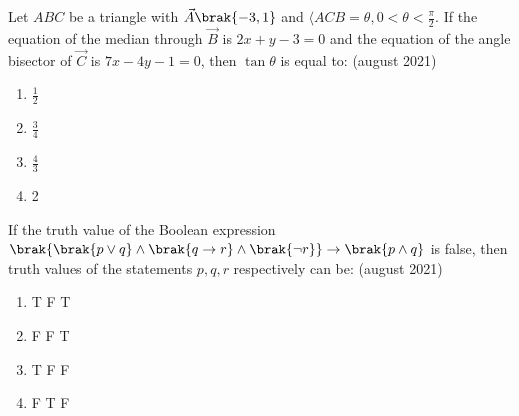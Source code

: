         \item Let $ABC$ be a triangle with $\vec{A}\brak{-3,1}$ and $\langle ACB=\theta,0<\theta<\frac{\pi}{2}$. If the equation of the median through $\vec{B}$ is $2x+y-3=0$ and the equation of the angle bisector of $\vec{C}$ is $7x-4y-1=0$, then $\tan \theta$ is equal to:
         \hfill{(august 2021)}  
		\begin{enumerate}
            \item $\frac{1}{2}$
            \item $\frac{3}{4}$
            \item $\frac{4}{3}$
            \item 2
        \end{enumerate}
        \item If the truth value of the Boolean expression $\brak{\brak{p \lor q} \land \brak{q\rightarrow r} \land \brak{\neg r}}\rightarrow \brak{p \land q}$ is false, then truth values of the statements $p,q,r$ respectively can be:
         \hfill{(august 2021)}  
	\begin{enumerate}
            \item T F T
            \item F F T
            \item T F F
            \item F T F
        \end{enumerate}

